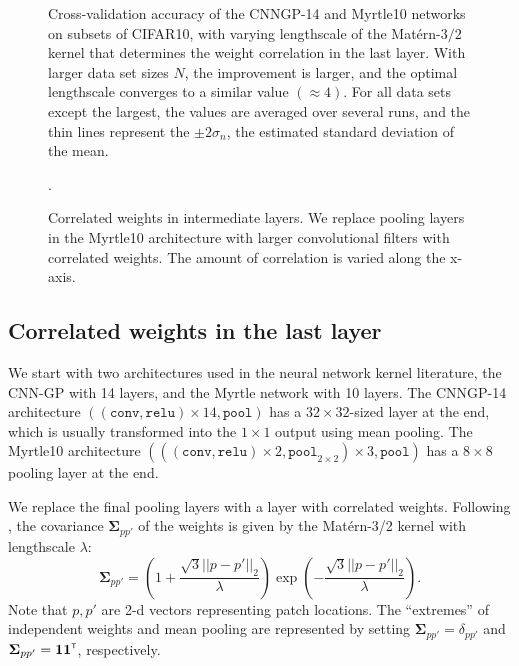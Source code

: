 \documentclass[tablecaption=bottom,wcp,nonatbib]{jmlr} %
\newcommand{\vSigma}{\boldsymbol{\Sigma}}
\newcommand{\tp}{{\mathrm{\textsf{\tiny T}}}}
\newcommand{\bracket}[3]{{\left#1 #3 \right#2}}
\newcommand{\bra}{\bracket{(}{)}}
\begin{document}

\begin{figure}[htpb]
 \scalebox{1.0}{}
  \caption{Cross-validation accuracy of the CNNGP-14 and Myrtle10 networks on subsets of CIFAR10, with varying lengthscale of the Matérn-$3/2$ kernel that determines the weight correlation in the last layer. With larger data set sizes $N$, the improvement is larger, and the optimal lengthscale converges to a similar value $(\approx 4)$. For all data sets except the largest, the values are averaged over several runs, and the thin lines represent the $\pm 2\sigma_n$, the estimated standard deviation of the mean. \label{ref:fig-last-layer}}
\end{figure}

\begin{figure}[htpb]
  \scalebox{1.0}{}.
  \caption{Correlated weights in intermediate layers. We replace pooling layers in the Myrtle10 architecture with larger convolutional filters with correlated weights. The amount of correlation is varied along the x-axis. \label{ref:fig-all-layers}}
\end{figure}


\subsection{Correlated weights in the last layer}

We start with two architectures used in the neural network kernel literature, the CNN-GP \citep{novak2019infiniteconv,arora2019exact} with 14 layers, and the Myrtle network \citep{shankar2020without} with 10 layers. The CNNGP-14 architecture $((\texttt{conv}, \texttt{relu})\times 14, \texttt{pool})$ has a $32 \times 32$-sized layer at the end, which is usually transformed into the $1 \times 1$ output using mean pooling. The Myrtle10 architecture $(((\texttt{conv},\texttt{relu})\times 2, \texttt{pool}_{2\times 2}) \times 3, \texttt{pool})$ has a $8\times 8$ pooling layer at the end.

We replace the final pooling layers with a layer with correlated weights. Following \citet{dutordoir2020}, the covariance $\vSigma_{pp'}$ of the weights is given by the Matérn-3/2 kernel with lengthscale $\lambda$:
\begin{equation}
    \vSigma_{pp'} = \bra{1 + \frac{\sqrt{3}||p - p'||_2}{\lambda}} \exp\bra{-\frac{\sqrt{3}||p - p'||_2}{\lambda}}.
\end{equation}
Note that $p,p'$ are 2-d vectors representing patch locations. The ``extremes'' of independent weights and mean pooling are represented by setting $\vSigma_{pp'} = \delta_{pp'}$ and $\vSigma_{pp'} = {\boldsymbol 1\boldsymbol 1}^\tp$, respectively.
\end{document}
